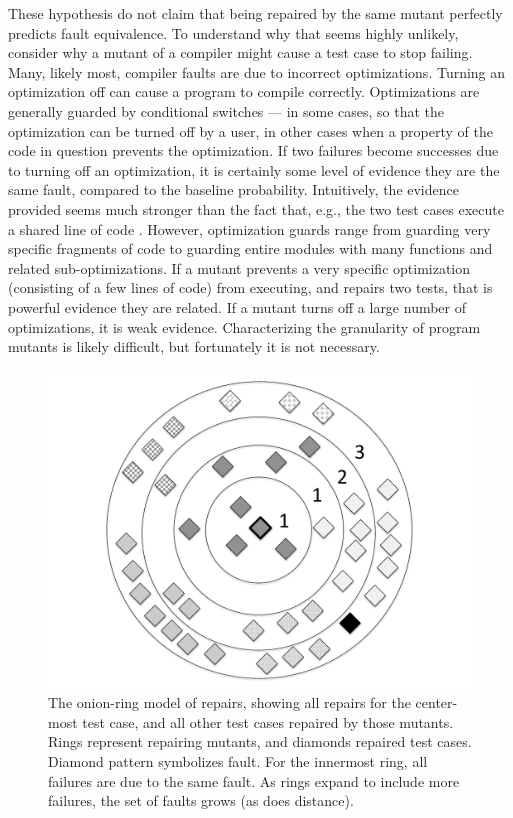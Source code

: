 These hypothesis do not claim that being repaired by the same mutant perfectly predicts fault equivalence.  To understand why that seems highly unlikely, consider why a mutant of a compiler might cause a test case to stop failing.  Many, likely most, compiler faults are due to incorrect optimizations.  Turning an optimization off can cause a program to compile correctly.  Optimizations are generally guarded by conditional switches --- in some cases, so that the optimization can be turned off by a user, in other cases when a property of the code in question prevents the optimization.  If two failures become successes due to turning off an optimization, it is certainly some level of evidence they are the same fault, compared to the baseline probability.  Intuitively, the evidence provided seems much stronger than the fact that, e.g., the two test cases execute a shared line of code \cite{RepsSpectra}.  However, optimization guards range from guarding very specific fragments of code to guarding entire modules with many functions and related sub-optimizations.  If a mutant prevents a very specific optimization (consisting of a few lines of code) from executing, and repairs two tests, that is powerful evidence they are related.  If a mutant turns off a large number of optimizations, it is weak evidence.  Characterizing the granularity of program mutants is likely difficult, but fortunately it is not necessary.

\begin{figure}
\centering
\includegraphics[width=0.6\columnwidth]{onionring}
\caption{\scriptsize{The onion-ring model of repairs, showing all repairs for the center-most test case, and all other test cases repaired by those mutants.  Rings represent repairing mutants, and diamonds repaired test cases.  Diamond pattern symbolizes fault.  For the innermost ring, all failures are due to the same fault.  As rings expand to include more failures, the set of faults grows (as does distance).}}
\vspace{-0.1in}
\label{fig:onion}
\end{figure}

